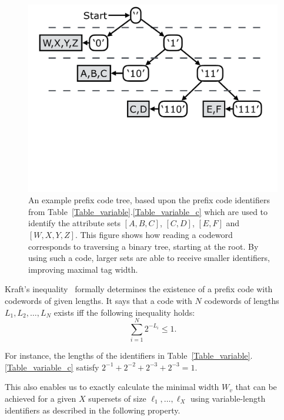 \begin{figure}[t!] 
\begin{minipage}{1\linewidth}
\includegraphics[trim={0 10cm 0 0}, clip, width=\linewidth]{figures/code_tree}
\end{minipage} 
\caption{An example prefix code tree, based upon the prefix code identifiers from Table~\ref{Table_variable}.\ref{Table_variable_c} which are used to identify the attribute sets $[A,B,C]$, $[C,D]$, $[E,F]$ and $[W,X,Y,Z]$. This figure shows how reading a codeword corresponds to traversing a binary tree, starting at the root. By using such a code, larger sets are able to receive smaller identifiers, improving maximal  tag width.}
\label{fig:code_tree}
\end{figure}


Kraft's inequality~\cite{abramson} formally determines the existence of a prefix code with codewords of given lengths. It says that a code with $N$ codewords of lengths 
 $L_1, L_2, \ldots, L_N$ exists 
iff the following inequality holds:
$$ \sum_{i = 1}^{N}{2^{-L_i}} \le 1. $$

For instance, the lengths of the identifiers in Table~\ref{Table_variable}.\ref{Table_variable_c} satisfy $2^{-1} + 2^{-2} + 2^{-3} + 2^{-3} = 1$.

This also enables us to exactly calculate the minimal width $W_{v}$ that can be achieved for a given $X$ supersets of size $\ell_1, \ldots, \ell_X$  using variable-length identifiers as described in the following property.

